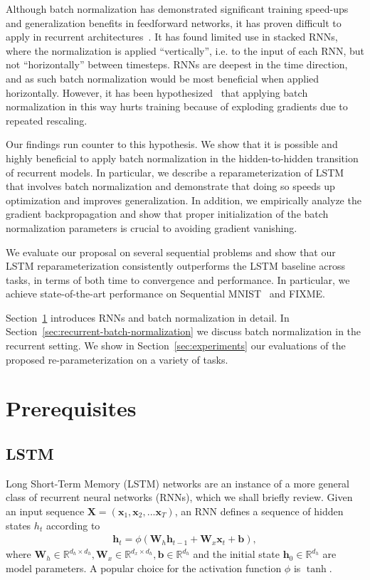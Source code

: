 \documentclass{article} %
\newcommand{\vect}[1]{\mathbf{#1}}
\newcommand{\mat}[1]{\mathbf{#1}}
\newcommand{\reals}{\mathbb{R}}
\begin{document}
Although batch normalization has demonstrated significant training speed-ups and generalization benefits in feedforward networks,
it has proven difficult to apply in recurrent architectures~\cite{cesar,baidu}.
It has found limited use in stacked RNNs, where the normalization is applied ``vertically'', i.e. to the input of each RNN, but not ``horizontally'' between timesteps.
RNNs are deepest in the time direction, and as such batch normalization would be most beneficial when applied horizontally.
However, it has been hypothesized~\cite{cesar} that applying batch normalization in this way hurts training
because of exploding gradients due to repeated rescaling.

Our findings run counter to this hypothesis.
We show that it is possible and highly beneficial to apply batch normalization in the hidden-to-hidden transition of recurrent models.
In particular, we describe a reparameterization of LSTM that involves batch normalization
and demonstrate that doing so speeds up optimization and improves generalization.
In addition, we empirically analyze the gradient backpropagation and show that proper initialization
of the batch normalization parameters is crucial to avoiding gradient vanishing.

We evaluate our proposal on several sequential problems and show that our
LSTM reparameterization consistently outperforms the LSTM baseline across tasks,
in terms of both time to convergence and performance.
In particular, we achieve state-of-the-art performance on Sequential MNIST~\cite{le2015simple} and FIXME.

Section~\ref{sec:prerequisites} introduces RNNs and batch normalization in detail.
In Section~\ref{sec:recurrent-batch-normalization} we discuss batch normalization in the recurrent setting.
We show in Section~\ref{sec:experiments} our evaluations of the proposed re-parameterization on a variety of tasks.

\section{Prerequisites}
\label{sec:prerequisites}


\subsection{LSTM}

Long Short-Term Memory (LSTM) networks are an instance of a more general class of recurrent neural networks (RNNs),
which we shall briefly review.
Given an input sequence
$\mat{X} = ( \vect{x}_1, \vect{x}_2, ... \vect{x}_T )$,
an RNN defines a sequence of hidden states $h_t$ according to
\begin{eqnarray}
  \mat{h}_t = \phi(\mat{W}_h \vect{h}_{t-1} + \mat{W}_x  \vect{x}_t + \vect{b}),
\end{eqnarray}
where $\mat{W}_h \in \reals^{d_h \times d_h}, \mat{W}_x \in \reals^{d_x \times d_h}, \vect{b} \in \reals^{d_h}$
and the initial state $\vect{h}_0 \in \reals^{d_h}$ %
are model parameters.
A popular choice for the activation function $\phi$ is $\tanh$.
\end{document}
